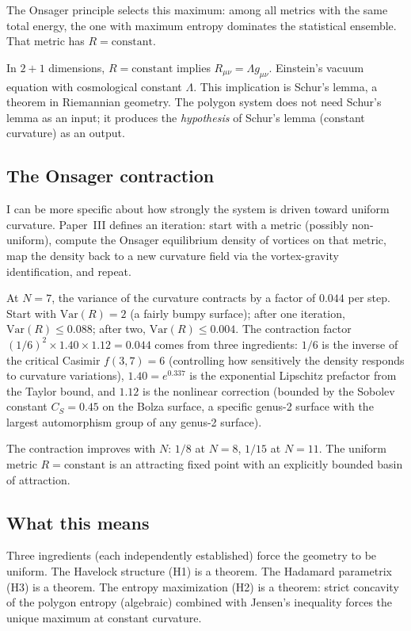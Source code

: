 The Onsager principle selects this maximum: among all metrics with the
same total energy, the one with maximum entropy dominates the
statistical ensemble. That metric has $R = \text{constant}$.

In $2{+}1$ dimensions, $R = \text{constant}$ implies
$R_{\mu\nu} = \Lambda g_{\mu\nu}$. Einstein's vacuum equation with
cosmological constant $\Lambda$. This implication is Schur's lemma, a
theorem in Riemannian geometry. The polygon system does not need Schur's
lemma as an input; it produces the \emph{hypothesis} of Schur's lemma
(constant curvature) as an output.

\subsection*{The Onsager contraction}

I can be more specific about how strongly the system is driven toward
uniform curvature. Paper~III defines an iteration: start with a metric
(possibly non-uniform), compute the Onsager equilibrium density of
vortices on that metric, map the density back to a new curvature field
via the vortex-gravity identification, and repeat.

At $N = 7$, the variance of the curvature contracts by a factor of
$0.044$ per step. Start with $\text{Var}(R) = 2$ (a fairly bumpy
surface); after one iteration, $\text{Var}(R) \le 0.088$; after two,
$\text{Var}(R) \le 0.004$. The contraction factor $(1/6)^2 \times 1.40
\times 1.12 = 0.044$ comes from three ingredients: $1/6$ is the inverse
of the critical Casimir $f(3, 7) = 6$ (controlling how sensitively the
density responds to curvature variations), $1.40 = e^{0.337}$ is the
exponential Lipschitz prefactor from the Taylor bound, and $1.12$ is the
nonlinear
correction (bounded by the Sobolev constant $C_S = 0.45$ on the Bolza
surface, a specific genus-2 surface with the largest automorphism group
of any genus-2 surface).

The contraction improves with $N$: $1/8$ at $N = 8$, $1/15$ at
$N = 11$. The uniform metric $R = \text{constant}$ is an attracting
fixed point with an explicitly bounded basin of attraction.

\subsection*{What this means}

Three ingredients (each independently established) force the geometry
to be uniform. The Havelock structure (H1) is a theorem. The Hadamard
parametrix (H3) is a theorem. The entropy maximization (H2) is a theorem:
strict concavity of the polygon entropy (algebraic) combined with
Jensen's inequality forces the unique maximum at constant curvature.


